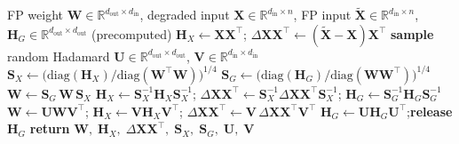 \documentclass{article} %
\begin{document}
\begin{algorithm}[H]
\caption{Bidirectional Incoherence Pre-Processing (BiIP)}
\label{algo1}
\small
\begin{algorithmic}[1]
\Require FP weight $\mathbf{W} \in \mathbb{R}^{d_\mathrm{out} \times d_\mathrm{in}}$,
         degraded input $\mathbf{X} \in \mathbb{R}^{d_\mathrm{in} \times n}$,
         FP input $\tilde{\mathbf{X}} \in \mathbb{R}^{d_\mathrm{in} \times n}$,
         $\mathbf{H}_G \in \mathbb{R}^{d_\mathrm{out} \times d_\mathrm{out}}$ (precomputed)
\State $\mathbf{H}_X \leftarrow \mathbf{X}\mathbf{X}^\top$;\quad
       $\Delta\mathbf{X}\mathbf{X}^\top \leftarrow (\tilde{\mathbf{X}} - \mathbf{X})\mathbf{X}^\top$
\State \textbf{sample} random Hadamard $\mathbf{U} \in \mathbb{R}^{d_\mathrm{out} \times d_\mathrm{out}}$,\;
       $\mathbf{V} \in \mathbb{R}^{d_\mathrm{in} \times d_\mathrm{in}}$
\State $\mathbf{S}_X \leftarrow \bigl(\mathrm{diag}(\mathbf{H}_X) / \mathrm{diag}(\mathbf{W}^\top \mathbf{W})\bigr)^{1/4}$
\State $\mathbf{S}_G \leftarrow \bigl(\mathrm{diag}(\mathbf{H}_G) / \mathrm{diag}(\mathbf{W}\mathbf{W}^\top)\bigr)^{1/4}$
\State $\mathbf{W} \leftarrow \mathbf{S}_G\,\mathbf{W}\,\mathbf{S}_X$
\State $\mathbf{H}_X \leftarrow \mathbf{S}_X^{-1}\mathbf{H}_X\mathbf{S}_X^{-1}$;\quad
       $\Delta\mathbf{X}\mathbf{X}^\top \leftarrow \mathbf{S}_X^{-1}\Delta\mathbf{X}\mathbf{X}^\top\mathbf{S}_X^{-1}$;\quad
        $\mathbf{H}_G \leftarrow \mathbf{S}_G^{-1}\mathbf{H}_G\mathbf{S}_G^{-1}$
\State $\mathbf{W} \leftarrow \mathbf{U}\mathbf{W}\mathbf{V}^\top$;\quad
       $\mathbf{H}_X \leftarrow \mathbf{V}\mathbf{H}_X\mathbf{V}^\top$;\quad
       $\Delta\mathbf{X}\mathbf{X}^\top \leftarrow \mathbf{V}\,\Delta\mathbf{X}\mathbf{X}^\top\mathbf{V}^\top$
\State $\mathbf{H}_G \leftarrow \mathbf{U}\mathbf{H}_G\mathbf{U}^\top$;\quad \textbf{release} $\mathbf{H}_G$
\State \textbf{return} $\mathbf{W},\;\mathbf{H}_X,\;\Delta\mathbf{X}\mathbf{X}^\top,\;\mathbf{S}_X,\;\mathbf{S}_G,\;\mathbf{U},\;\mathbf{V}$
\end{algorithmic}
\end{algorithm}
\end{document}
